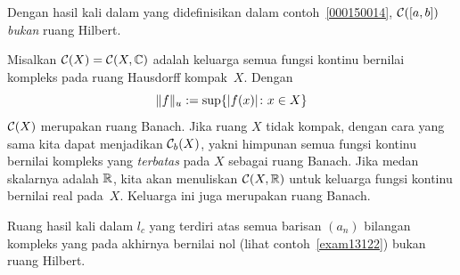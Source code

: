 \begin{exam} Dengan hasil kali dalam yang didefinisikan dalam contoh~\ref{000150014}, $\mathcal{C}([a,b])$ \emph{bukan} ruang Hilbert.
\end{exam}

\begin{exam}\label{exam_CX} Misalkan $\mathcal{C}(X) = \mathcal{C}(X,\mathbb{C})$ adalah keluarga semua fungsi kontinu bernilai kompleks pada ruang
Hausdorff kompak~$X$.  Dengan
   \[ \lVert f\rVert_u := \sup\{\lvert f(x)\rvert\colon x \in X\} \]
$\mathcal{C}(X)$ merupakan ruang Banach.  Jika ruang $X$ tidak kompak, dengan cara yang sama kita dapat menjadikan $\mathcal{C}_b(X)$, yakni himpunan
semua fungsi kontinu bernilai kompleks yang \emph{terbatas} pada $X$ sebagai ruang Banach.
Jika medan skalarnya adalah $\mathbb{R}$, kita akan
menuliskan $\mathcal{C}(X,\mathbb{R})$ untuk keluarga fungsi kontinu bernilai real pada~$X$.  Keluarga ini juga merupakan ruang Banach.
\end{exam}

\begin{exam}\label{000213} Ruang hasil kali dalam $l_c$ yang terdiri atas semua barisan $(a_n)$ bilangan kompleks yang pada akhirnya bernilai nol
(lihat contoh~\ref{exam13122}) bukan ruang Hilbert.
\end{exam}

